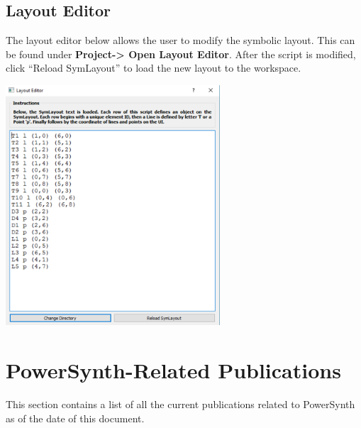 \documentclass[11pt]{article}
\begin{document}
\pagebreak

\subsection{Layout Editor}
\label{sec-3-3}

The layout editor below allows the user to modify the symbolic layout. This can be found under \textbf{Project-> Open Layout Editor}. After the script is modified, click “Reload SymLayout” to load the new layout to the workspace. 

\begin{center}
\includegraphics[width=0.6\textwidth]{./figs/41_LayoutEditor.png}
\end{center}

\pagebreak

\section{PowerSynth-Related Publications}
\label{sec-4}

This section contains a list of all the current publications related to PowerSynth as of the date of this document.
\end{document}
